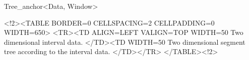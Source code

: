 \begin{ccClassTemplate}{Tree_anchor<Data, Window>}
\begin{ccHtmlOnly}
        <!2><TABLE BORDER=0 CELLSPACING=2 CELLPADDING=0 WIDTH=650>
        <TR><TD ALIGN=LEFT VALIGN=TOP WIDTH=50%
Two dimensional interval data.
 </TD><TD WIDTH=50%
Two dimensional segment tree
  according to the interval data.
 </TD></TR>
        </TABLE><!2>
\end{ccHtmlOnly}
\end{ccClassTemplate}

\def\ccTagRmEigenClassName{\ccTrue}
\def\ccLongParamLayout{\ccFalse}


